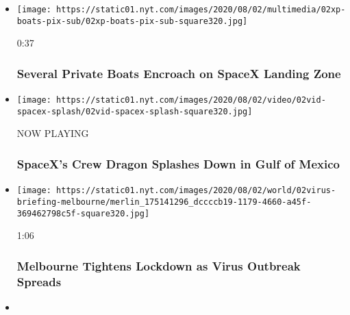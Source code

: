 \begin{itemize}
\item
  \href{https://www.nytimes.com/video/us/100000007269193/boats-circle-spacex-capsule.html?action=click\&module=video-series-bar\&region=header\&pgtype=Article\&playlistId=video/latest-video}{}

  \texttt{[image: https://static01.nyt.com/images/2020/08/02/multimedia/02xp-boats-pix-sub/02xp-boats-pix-sub-square320.jpg]}

  0:37

  \hypertarget{several-private-boats-encroach-on-spacex-landing-zone}{%
  \subsubsection{Several Private Boats Encroach on SpaceX Landing
  Zone}\label{several-private-boats-encroach-on-spacex-landing-zone}}
\item
  \texttt{[image: https://static01.nyt.com/images/2020/08/02/video/02vid-spacex-splash/02vid-spacex-splash-square320.jpg]}

  NOW PLAYING

  \hypertarget{spacexs-crew-dragon-splashes-down-in-gulf-of-mexico-2}{%
  \subsubsection{SpaceX's Crew Dragon Splashes Down in Gulf of
  Mexico}\label{spacexs-crew-dragon-splashes-down-in-gulf-of-mexico-2}}
\item
  \href{https://www.nytimes.com/video/world/australia/100000007269116/coronavirus-restrictions-melbourne.html?action=click\&module=video-series-bar\&region=header\&pgtype=Article\&playlistId=video/latest-video}{}

  \texttt{[image: https://static01.nyt.com/images/2020/08/02/world/02virus-briefing-melbourne/merlin\_175141296\_dccccb19-1179-4660-a45f-369462798c5f-square320.jpg]}

  1:06

  \hypertarget{melbourne-tightens-lockdown-as-virus-outbreak-spreads}{%
  \subsubsection{Melbourne Tightens Lockdown as Virus Outbreak
  Spreads}\label{melbourne-tightens-lockdown-as-virus-outbreak-spreads}}
\item
  \href{https://www.nytimes.com/video/us/100000007268938/isaias-florida.html?action=click\&module=video-series-bar\&region=header\&pgtype=Article\&playlistId=video/latest-video}{}


\end{itemize}
